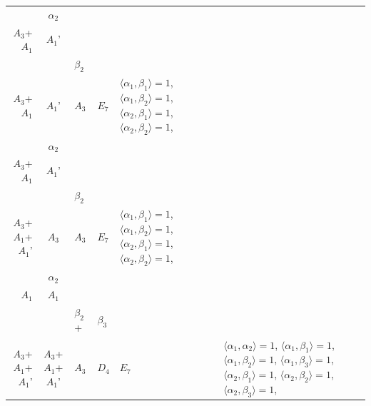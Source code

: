 \documentclass[12pt]{report}
\begin{document}
\begin{appendix}
{\begin{longtable}{rcl p{1cm}p{1cm}p{3cm} }
\\
\begin{tabular}{cc}$\alpha_1$+ & $\alpha_2$\\\tiny{ $A_3$+$A_1$ } & \tiny{ $A_1$' }\end{tabular} &\begin{tabular}{c} = \\~ \end{tabular} & \begin{tabular}{cc}$\beta_1$+ & $\beta_2$\\\tiny{ $A_3$+$A_1$ } & \tiny{ $A_1$' }\end{tabular} & $A_3$ & $E_7$ &  $\langle\alpha_1, \beta_1\rangle=1$, $\langle\alpha_1, \beta_2\rangle=1$, $\langle\alpha_2, \beta_1\rangle=1$, $\langle\alpha_2, \beta_2\rangle=1$, 
\\
\begin{tabular}{cc}$\alpha_1$+ & $\alpha_2$\\\tiny{ $A_3$+$A_1$ } & \tiny{ $A_1$' }\end{tabular} &\begin{tabular}{c} = \\~ \end{tabular} & \begin{tabular}{cc}$\beta_1$+ & $\beta_2$\\\tiny{ $A_3$+$A_1$+$A_1$' } & \tiny{ $A_3$ }\end{tabular} & $A_3$ & $E_7$ &  $\langle\alpha_1, \beta_1\rangle=1$, $\langle\alpha_1, \beta_2\rangle=1$, $\langle\alpha_2, \beta_1\rangle=1$, $\langle\alpha_2, \beta_2\rangle=1$, 
\\
\begin{tabular}{cc}$\alpha_1$+ & $\alpha_2$\\\tiny{ $A_1$ } & \tiny{ $A_1$ }\end{tabular} &\begin{tabular}{c} = \\~ \end{tabular} & \begin{tabular}{ccc}$\beta_1$+ & $\beta_2$+ & $\beta_3$\\\tiny{ $A_3$+$A_1$+$A_1$' } & \tiny{ $A_3$+$A_1$+$A_1$' } & \tiny{ $A_3$ }\end{tabular} & $D_4$ & $E_7$ & $\langle\alpha_1, \alpha_2\rangle=1$,  $\langle\alpha_1, \beta_1\rangle=1$, $\langle\alpha_1, \beta_2\rangle=1$, $\langle\alpha_1, \beta_3\rangle=1$, $\langle\alpha_2, \beta_1\rangle=1$, $\langle\alpha_2, \beta_2\rangle=1$, $\langle\alpha_2, \beta_3\rangle=1$, 
\\

\end{longtable}}
\end{appendix}
\end{document}
